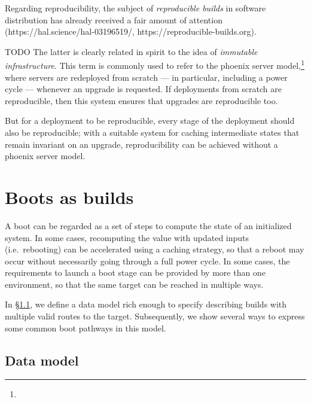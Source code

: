 Regarding reproducibility, the subject of \emph{reproducible builds} in software distribution has already received a fair amount of attention \cite{lamb:hal-03196519} (https://hal.science/hal-03196519/, https://reproducible-builds.org).
  
TODO
  The latter is clearly related in spirit to the idea of \emph{immutable infrastructure}.
  This term is commonly used to refer to the phoenix server model,\footnote{} where servers are redeployed from scratch --- in particular, including a power cycle --- whenever an upgrade is requested.
  If deployments from scratch are reproducible, then this system ensures that upgrades are reproducible too.

  But for a deployment to be reproducible, every stage of the deployment should also be reproducible; with a suitable system for caching intermediate states that remain invariant on an upgrade, reproducibility can be achieved without a phoenix server model.


\section{Boots as builds} \label{build}

A boot can be regarded as a set of steps to compute the state of an initialized system. 
%
In some cases, recomputing the value with updated inputs (i.e.~rebooting) can be accelerated using a caching strategy, so that a reboot may occur without necessarily going through a full power cycle.
%
In some cases, the requirements to launch a boot stage can be provided by more than one environment, so that the same target can be reached in multiple ways.

In \S\ref{data-model}, we define a data model rich enough to specify describing builds with multiple valid routes to the target.
%
Subsequently, we show several ways to express some common boot pathways in this model.

\subsection{Data model} \label{data-model}

